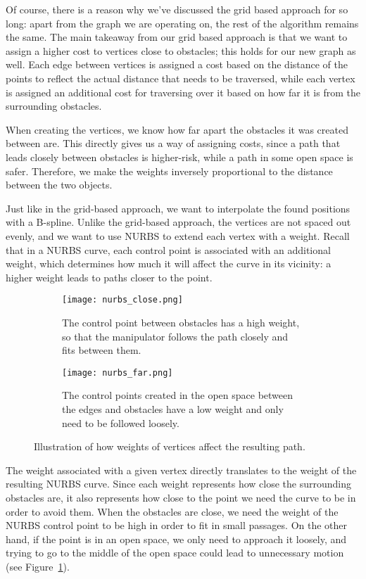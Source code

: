 Of course, there is a reason why we've discussed the grid based approach for so long: apart from the graph we are operating on, the rest of the algorithm remains the same.
The main takeaway from our grid based approach is that we want to assign a higher cost to vertices close to obstacles; this holds for our new graph as well. Each edge between vertices is assigned a cost based on the distance of the points to reflect the actual distance that needs to be traversed, while each vertex is assigned an additional cost for traversing over it based on how far it is from the surrounding obstacles.

When creating the vertices, we know how far apart the obstacles it was created between are. This directly gives us a way of assigning costs, since a path that leads closely between obstacles is higher-risk, while a path in some open space is safer. Therefore, we make the weights inversely proportional to the distance between the two objects.

Just like in the grid-based approach, we want to interpolate the found positions with a B-spline. Unlike the grid-based approach, the vertices are not spaced out evenly, and we want to use NURBS to extend each vertex with a weight. Recall that in a NURBS curve, each control point is associated with an additional weight, which determines how much it will affect the curve in its vicinity: a higher weight leads to paths closer to the point.

\begin{figure}
  \centering
  \begin{subfigure}{.45\textwidth}
    \texttt{[image: nurbs\_close.png]}
    \caption{The control point between obstacles has a high weight, so that the manipulator follows the path closely and fits between them.}
  \end{subfigure}
  \begin{subfigure}{0.45\textwidth}
    \texttt{[image: nurbs\_far.png]}
    \caption{The control points created in the open space between the edges and obstacles have a low weight and only need to be followed loosely.}
  \end{subfigure}
  \caption{Illustration of how weights of vertices affect the resulting path.}\label{fig:nurb_paths}
\end{figure}

The weight associated with a given vertex directly translates to the weight of the resulting NURBS curve. Since each weight represents how close the surrounding obstacles are, it also represents how close to the point we need the curve to be in order to avoid them. When the obstacles are close, we need the weight of the NURBS control point to be high in order to fit in small passages. On the other hand, if the point is in an open space, we only need to approach it loosely, and trying to go to the middle of the open space could lead to unnecessary motion (see Figure~\ref{fig:nurb_paths}).

